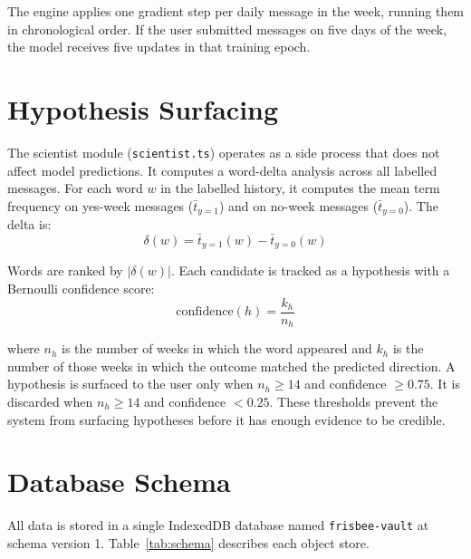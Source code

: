 \documentclass[11pt, a4paper]{report}
\begin{document}
The engine applies one gradient step per daily message in the week,
running them in chronological order. If the user submitted messages on
five days of the week, the model receives five updates in that training
epoch.

\section{Hypothesis Surfacing}

The scientist module (\texttt{scientist.ts}) operates as a side process
that does not affect model predictions. It computes a word-delta analysis
across all labelled messages. For each word $w$ in the labelled history,
it computes the mean term frequency on yes-week messages ($\bar{t}_{y=1}$)
and on no-week messages ($\bar{t}_{y=0}$). The delta is:
\begin{equation}
  \delta(w) = \bar{t}_{y=1}(w) - \bar{t}_{y=0}(w)
\end{equation}

Words are ranked by $|\delta(w)|$. Each candidate is tracked as a
hypothesis with a Bernoulli confidence score:
\begin{equation}
  \mathrm{confidence}(h) = \frac{k_h}{n_h}
\end{equation}

where $n_h$ is the number of weeks in which the word appeared and $k_h$
is the number of those weeks in which the outcome matched the predicted
direction. A hypothesis is surfaced to the user only when $n_h \geq 14$
and confidence $\geq 0.75$. It is discarded when $n_h \geq 14$ and
confidence $< 0.25$. These thresholds prevent the system from surfacing
hypotheses before it has enough evidence to be credible.

\section{Database Schema}

All data is stored in a single IndexedDB database named
\texttt{frisbee-vault} at schema version 1. Table~\ref{tab:schema}
describes each object store.
\end{document}
